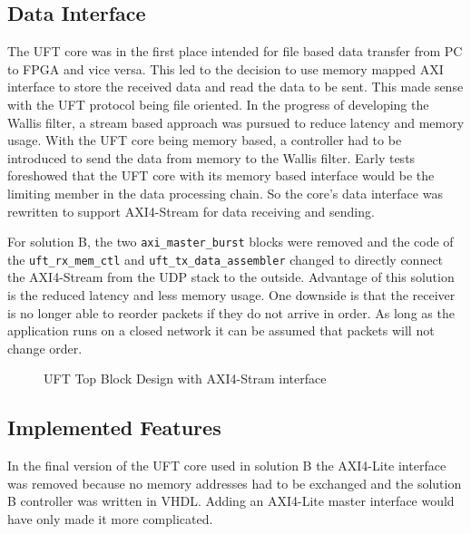 \subsection{Data Interface} \label{ch:data:com:datainterface}
The UFT core was in the first place intended for file based data transfer from
PC to FPGA and vice versa. This led to the decision to use memory mapped AXI
interface to store the received data and read the data to be sent. This made
sense with the UFT protocol being file oriented. In the progress of developing
the Wallis filter, a stream based approach was pursued to reduce latency and
memory usage. With the UFT core being memory based, a controller had to be
introduced to send the data from memory to the Wallis filter. Early tests
foreshowed that the UFT core with its memory based interface would be the
limiting member in the data processing chain. So the core's data interface was
rewritten to support AXI4-Stream for data receiving and sending.

For solution B, the two \texttt{axi\_master\_burst} blocks were removed and the
code of the \texttt{uft\_rx\_mem\_ctl} and \texttt{uft\_tx\_data\_assembler}
changed to directly connect the AXI4-Stream from the UDP stack to the outside.
Advantage of this solution is the reduced latency and less memory usage. One
downside is that the receiver is no longer able to reorder packets if they do
not arrive in order. As long as the application runs on a closed network it can
be assumed that packets will not change order.

\begin{figure}[b!]
    \centering
    \begin{adjustbox}{max width=\textwidth}
        
    \end{adjustbox}
    \caption{UFT Top Block Design with AXI4-Stram interface}
    \label{fig:ufttopstream}
\end{figure}

\clearpage
\subsection{Implemented Features}
In the final version of the UFT core used in solution B the AXI4-Lite interface
was removed because no memory addresses had to be exchanged and the solution B
controller was written in VHDL. Adding an AXI4-Lite master interface would have
only made it more complicated. 
\\

